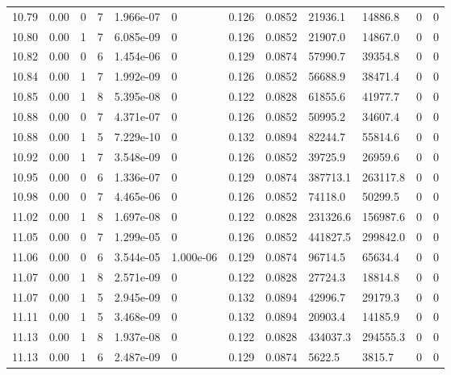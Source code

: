 \documentclass[preview]{standalone}
\begin{document}
{{{{{{{{{{{{{\begin{tabular}{L{1.2cm}C{1.2cm} C{0.3cm}C{0.5cm} C{1.4cm}C{1.4cm} C{1.4cm}C{1.4cm} C{1.6cm}C{1.6cm} C{1.6cm}C{1.6cm}}
  10.79  &  0.00  & 0     &  7 &  1.966e-07  & 0  &  0.126&   0.0852& 21936.1 & 14886.8   &  0 & 0  \\ 
  10.80  &  0.00  & 1     &  7 &  6.085e-09  & 0  &  0.126&   0.0852& 21907.0 & 14867.0   &  0 & 0  \\ 
  10.82  &  0.00  & 0     &  6 &  1.454e-06  & 0  &  0.129&   0.0874& 57990.7 & 39354.8   &  0 & 0  \\ 
  10.84  &  0.00  & 1     &  7 &  1.992e-09  & 0  &  0.126&   0.0852& 56688.9 & 38471.4   &  0 & 0  \\ 
  10.85  &  0.00  & 1     &  8 &  5.395e-08  & 0  &  0.122&   0.0828& 61855.6 & 41977.7   &  0 & 0  \\ 
  10.88  &  0.00  & 0     &  7 &  4.371e-07  & 0  &  0.126&   0.0852& 50995.2 & 34607.4   &  0 & 0  \\ 
  10.88  &  0.00  & 1     &  5 &  7.229e-10  & 0  &  0.132&   0.0894& 82244.7 & 55814.6   &  0 & 0  \\ 
  10.92  &  0.00  & 1     &  7 &  3.548e-09  & 0  &  0.126&   0.0852& 39725.9 & 26959.6   &  0 & 0  \\ 
  10.95  &  0.00  & 0     &  6 &  1.336e-07  & 0  &  0.129&   0.0874& 387713.1 & 263117.8   &  0 & 0  \\ 
  10.98  &  0.00  & 0     &  7 &  4.465e-06  & 0  &  0.126&   0.0852& 74118.0 & 50299.5   &  0 & 0  \\ 
  11.02  &  0.00  & 1     &  8 &  1.697e-08  & 0  &  0.122&   0.0828& 231326.6 & 156987.6   &  0 & 0  \\ 
  11.05  &  0.00  & 0     &  7 &  1.299e-05  & 0  &  0.126&   0.0852& 441827.5 & 299842.0   &  0 & 0  \\ 
  11.06  &  0.00  & 0     &  6 &  3.544e-05  & 1.000e-06  &  0.129&   0.0874& 96714.5 & 65634.4   &  0 & 0  \\ 
  11.07  &  0.00  & 1     &  8 &  2.571e-09  & 0  &  0.122&   0.0828& 27724.3 & 18814.8   &  0 & 0  \\ 
  11.07  &  0.00  & 1     &  5 &  2.945e-09  & 0  &  0.132&   0.0894& 42996.7 & 29179.3   &  0 & 0  \\ 
  11.11  &  0.00  & 1     &  5 &  3.468e-09  & 0  &  0.132&   0.0894& 20903.4 & 14185.9   &  0 & 0  \\ 
  11.13  &  0.00  & 1     &  8 &  1.937e-08  & 0  &  0.122&   0.0828& 434037.3 & 294555.3   &  0 & 0  \\ 
  11.13  &  0.00  & 1     &  6 &  2.487e-09  & 0  &  0.129&   0.0874& 5622.5 & 3815.7   &  0 & 0  \\ 

\end{tabular}}}}}}}}}}}}}}
\end{document}
